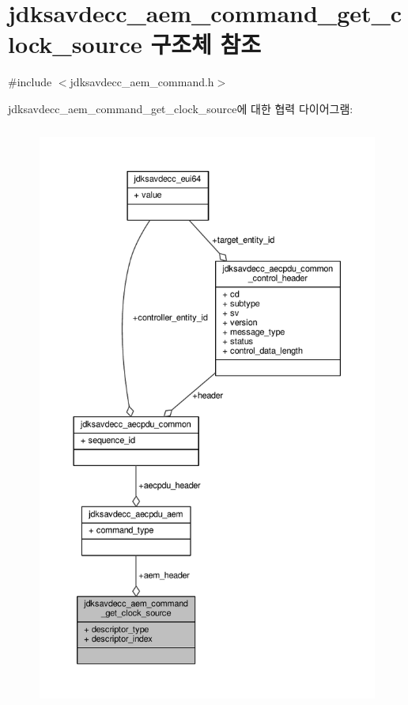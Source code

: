 \hypertarget{structjdksavdecc__aem__command__get__clock__source}{}\section{jdksavdecc\+\_\+aem\+\_\+command\+\_\+get\+\_\+clock\+\_\+source 구조체 참조}
\label{structjdksavdecc__aem__command__get__clock__source}


{\ttfamily \#include $<$jdksavdecc\+\_\+aem\+\_\+command.\+h$>$}



jdksavdecc\+\_\+aem\+\_\+command\+\_\+get\+\_\+clock\+\_\+source에 대한 협력 다이어그램\+:
\nopagebreak
\begin{figure}[H]
\begin{center}
\leavevmode
\includegraphics[height=550pt]{structjdksavdecc__aem__command__get__clock__source__coll__graph}
\end{center}
\end{figure}
